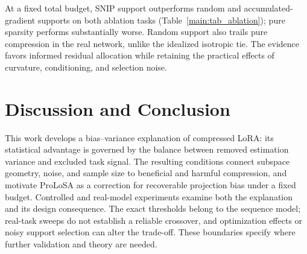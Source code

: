 At a fixed total budget, SNIP support outperforms random and accumulated-gradient supports on both ablation tasks (Table~\ref{main:tab_ablation}); pure sparsity performs substantially worse. Random support also trails pure compression in the real network, unlike the idealized isotropic tie. The evidence favors informed residual allocation while retaining the practical effects of curvature, conditioning, and selection noise.

\section{Discussion and Conclusion}
\label{sec:conclusion}
This work develops a bias--variance explanation of compressed LoRA: its statistical advantage is governed by the balance between removed estimation variance and excluded task signal. The resulting conditions connect subspace geometry, noise, and sample size to beneficial and harmful compression, and motivate ProLoSA as a correction for recoverable projection bias under a fixed budget. Controlled and real-model experiments examine both the explanation and its design consequence. The exact thresholds belong to the sequence model; real-task sweeps do not establish a reliable crossover, and optimization effects or noisy support selection can alter the trade-off. These boundaries specify where further validation and theory are needed.
